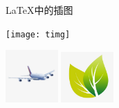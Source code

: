 \documentclass{ctexart} %
\begin{document}
    \LaTeX{}中的插图

    \texttt{[image: timg]}
    
    \includegraphics[width=2cm]{figures/timg1.jpg}
    \includegraphics[width=2cm]{pics/123.jpg}
\end{document}
